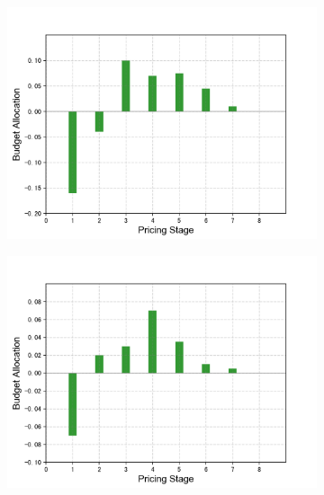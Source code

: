\documentclass[sigconf,authordraft]{acmart}
\begin{document}
\begin{figure}[tb]
    \centering
    \begin{subfigure}[b]{0.2\textwidth}
    \includegraphics[width=\textwidth]{m-pricing-a.png}
  
    \end{subfigure}
    \quad
    \begin{subfigure}[b]{0.2\textwidth}
    \includegraphics[width=\textwidth]{m-pricing-b.png}
    \end{subfigure}
    

\end{figure}
\end{document}
